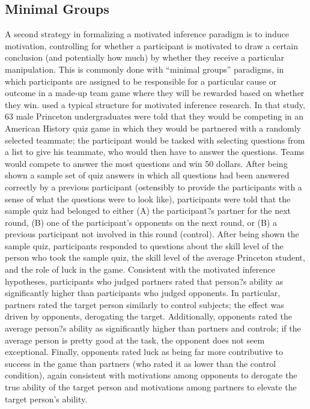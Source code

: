 \documentclass{article}
\begin{document}
\subsection{Minimal Groups}
A second strategy in formalizing a motivated inference paradigm is to induce motivation, controlling for whether a participant is motivated to draw a certain conclusion (and potentially how much) by whether they receive a particular manipulation. This is commonly done with ``minimal groups'' paradigms, in which participants are assigned to be responsible for a particular cause or outcome in a made-up team game where they will be rewarded based on whether they win. \citet{Klein1992} used a typical structure for motivated inference research. In that study, 63 male Princeton undergraduates were told that they would be competing in an American History quiz game in which they would be partnered with a randomly selected teammate; the participant would be tasked with selecting questions from a list to give his teammate, who would then have to answer the questions. Teams would compete to answer the most questions and win 50 dollars. After being shown a sample set of quiz answers in which all questions had been answered correctly by a previous participant (ostensibly to provide the participants with a sense of what the questions were to look like), participants were told that the sample quiz had belonged to either (A) the participant?s partner for the next round, (B) one of the participant's opponents on the next round, or (B) a previous participant not involved in this round (control). After being shown the sample quiz, participants responded to questions about the skill level of the person who took the sample quiz, the skill level of the average Princeton student, and the role of luck in the game. 
Consistent with the motivated inference hypotheses, participants who judged partners rated that person?s ability as significantly higher than participants who judged opponents. In particular, partners rated the target person similarly to control subjects; the effect was driven by opponents, derogating the target. Additionally, opponents rated the average person?s ability as significantly higher than partners and controls; if the average person is pretty good at the task, the opponent does not seem exceptional. Finally, opponents rated luck as being far more contributive to success in the game than partners (who rated it as lower than the control condition), again consistent with motivations among opponents to derogate the true ability of the target person and motivations among partners to elevate the target person's ability.  
\end{document}
